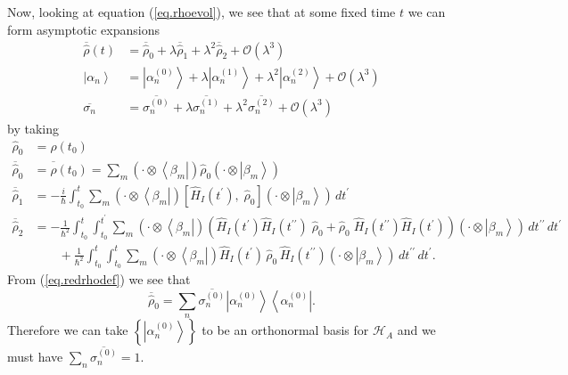 \documentclass[11pt]{article}
\newcommand{\Od}[1]{\mathcal{O}{\left(#1\right)}}
\newcommand{\bra}[1]{\left\langle#1\right|}
\newcommand{\ket}[1]{\left|#1\right\rangle}
\newcommand{\hilb}{\mathcal{H}}
\newcommand{\op}[1]{\hat{#1}}
\theoremstyle{theorem}
\theoremstyle{remark}
\theoremstyle{step}
\theoremstyle{gap}
\begin{document}
Now, looking at equation (\ref{eq.rhoevol}), we see that at some fixed time \(t\) we can form asymptotic expansions
\begin{align*}
\overline{\op{\rho}}(t) &= \overline{\op{\rho}}_0 + \lambda \overline{\op{\rho}}_1 + \lambda^2 \overline{\op{\rho}}_2 + \Od{\lambda^3} \\
\ket{\alpha_n} &= \ket{\alpha_n^{(0)}} + \lambda \ket{\alpha_n^{(1)}} + \lambda^2 \ket{\alpha_n^{(2)}} + \Od{\lambda^3} \\
\overline{\sigma_n} &= \overline{\sigma_n^{(0)}} + \lambda \overline{\sigma_n^{(1)}} + \lambda^2 \overline{\sigma_n^{(2)}} + \Od{\lambda^3}
\end{align*}
by taking
\begin{align}
\nonumber\op{\rho}_0 &= \op{\rho}\left(t_0\right) \\
\nonumber\overline{\op{\rho}}_0 &= \overline{\op{\rho}}\left(t_0\right) =  \sum_m \left(\cdot\otimes\bra{\beta_m}\right) \op{\rho}_0 \left(\cdot\otimes\ket{\beta_m}\right) \\
\label{eq.rho1red}\overline{\op{\rho}}_1 &= -\frac{i}{\hbar} \int_{t_0}^t \sum_m \left(\cdot\otimes\bra{\beta_m}\right) \left[\op{H}_I(t^\prime),\; \op{\rho}_0 \right]\left(\cdot\otimes\ket{\beta_m}\right) \,dt^\prime\\
\label{eq.rho2red}\overline{\op{\rho}}_2 &= - \frac{1}{\hbar^2} \int_{t_0}^t \int_{t_0}^{t^\prime} \sum_m \left(\cdot\otimes\bra{\beta_m}\right) \left( \op{H}_I (t^\prime) \op{H}_I(t^{\prime\prime}) \;\op{\rho}_0 + \op{\rho}_0\; \op{H}_I (t^{\prime\prime}) \op{H}_I(t^{\prime}) \right)\left(\cdot\otimes\ket{\beta_m}\right)\,dt^{\prime\prime}\,dt^\prime \\
\nonumber&\hspace{2em}+ \frac{1}{\hbar^2} \int_{t_0}^t \int_{t_0}^{t} \sum_m \left(\cdot\otimes\bra{\beta_m}\right) \op{H}_I (t^\prime) \,\op{\rho}_0\, \op{H}_I (t^{\prime\prime})\left(\cdot\otimes\ket{\beta_m}\right)\,dt^{\prime\prime}\,dt^\prime.
\end{align}
From (\ref{eq.redrhodef}) we see that
\begin{equation}\label{eq.rho0red}
\overline{\op{\rho}}_0 = \sum_n \overline{\sigma_{n}^{(0)}} \ket{\alpha_n^{(0)}}\bra{\alpha_n^{(0)}}.
\end{equation}
Therefore we can take \(\left\{\ket{\alpha_n^{(0)}}\right\}\) to be an orthonormal basis for \(\hilb_A\) and we must have \(\sum_n \overline{\sigma_n^{(0)}} = 1\).
\end{document}

